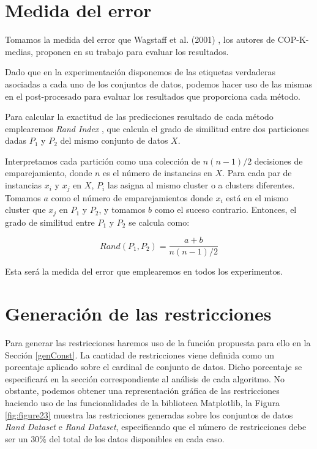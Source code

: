\section{Medida del error}

Tomamos la medida del error que Wagstaff et al. (2001) \cite{Wagstaff:2001b}, los autores de COP-K-medias, proponen en su trabajo para evaluar los resultados.

Dado que en la experimentación disponemos de las etiquetas verdaderas asociadas a cada uno de los conjuntos de datos, podemos hacer uso de las mismas en el post-procesado para evaluar los resultados que proporciona cada método.

Para calcular la exactitud de las predicciones resultado de cada método emplearemos \textit{Rand Index} \cite{Rand:1971}, que calcula el grado de similitud entre dos particiones dadas $P_1$ y $P_2$ del mismo conjunto de datos $X$.

Interpretamos cada partición como una colección de $n (n-1) / 2$ decisiones de emparejamiento, donde $n$ es el número de instancias en $X$. Para cada par de instancias $x_i$ y $x_j$ en $X$, $P_i$ las asigna al mismo cluster o a clusters diferentes. Tomamos $a$ como el número de emparejamientos donde $x_i$ está en el mismo cluster que $x_j$ en $P_1$ y $P_2$, y tomamos $b$ como el suceso contrario. Entonces, el grado de similitud entre $P_1$ y $P_2$ se calcula como:

\begin{equation}
Rand(P_1, P_2) = \frac{a + b}{n (n-1) / 2}
\label{eqn70}
\end{equation}

Esta será la medida del error que emplearemos en todos los experimentos.

\section{Generación de las restricciones}

Para generar las restricciones haremos uso de la función propuesta para ello en la Sección \ref{genConst}. La cantidad de restricciones viene definida como un porcentaje aplicado sobre el cardinal de conjunto de datos. Dicho porcentaje se especificará en la sección correspondiente al análisis de cada algoritmo. No obstante, podemos obtener una representación gráfica de las restricciones haciendo uso de las funcionalidades de la biblioteca Matplotlib, la Figura \ref{fig:figure23} muestra las restricciones generadas sobre los conjuntos de datos \textit{Rand Dataset} e \textit{Rand Dataset}, especificando que el número de restricciones debe ser un $30\%$ del total de los datos disponibles en cada caso.



